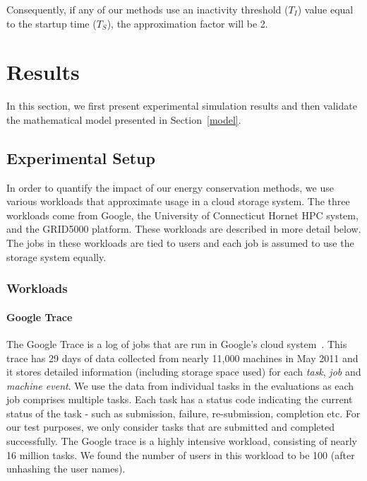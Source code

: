 \documentclass[preprint,12pt]{elsarticle}
\begin{document}
Consequently, if any of our methods use an inactivity threshold ($T_{I}$) value
equal to the startup time ($T_{S}$), the approximation factor will be 2.

\section{Results}
\label{results}
In this section, we first present experimental simulation results and
then validate the mathematical model presented in Section~\ref{model}.

\subsection{Experimental Setup}
In order to quantify the impact of our energy conservation methods,
we use various workloads that approximate usage in a cloud storage
system. The three workloads come from Google, the University of
Connecticut Hornet HPC system, and the GRID5000 platform. These workloads
are described in more detail below. The jobs in these workloads
are tied to users and each job is assumed to use the storage system equally.

\subsubsection{Workloads}
\paragraph{Google Trace}
The Google Trace is a log of jobs that are run in Google's cloud
system~\cite{clusterdata:Wilkes2011}. This trace has 29 days of data
collected from nearly 11,000 machines in May 2011 and it stores
detailed information (including storage space used) for each \textit{task},
\textit{job} and \textit{machine event}. We use the data from individual tasks in the
evaluations as each job comprises multiple tasks. Each task has a status
code indicating the current status of the task - such as submission, failure,
re-submission, completion etc. For our test purposes, we only consider tasks
that are submitted and completed successfully. The Google trace is a highly 
intensive workload, consisting of nearly 16 million tasks. We found the number
of users in this workload to be 100 (after unhashing the user names).
\end{document}
